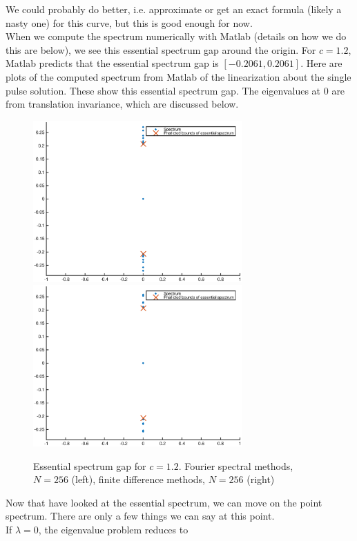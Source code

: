 \documentclass[12pt]{article}
\begin{document}
We could probably do better, i.e. approximate or get an exact formula (likely a nasty one) for this curve, but this is good enough for now.\\

When we compute the spectrum numerically with Matlab (details on how we do this are below), we see this essential spectrum gap around the origin. For $c = 1.2$, Matlab predicts that the essential spectrum gap is $[-0.2061, 0.2061]$. Here are plots of the computed spectrum from Matlab of the linearization about the single pulse solution. These show this essential spectrum gap. The eigenvalues at 0 are from translation invariance, which are discussed below.

\begin{figure}[H]
\centering
\includegraphics[width=8cm]{essspecboundsF256.eps}
\includegraphics[width=8cm]{essspecboundsFD256.eps}
\caption{Essential spectrum gap for $c = 1.2$. Fourier spectral methods, $N = 256$ (left), finite difference methods, $N = 256$ (right)}
\end{figure}

Now that have looked at the essential spectrum, we can move on the point spectrum. There are only a few things we can say at this point.\\

If $\lambda = 0$, the eigenvalue problem reduces to
\end{document}
